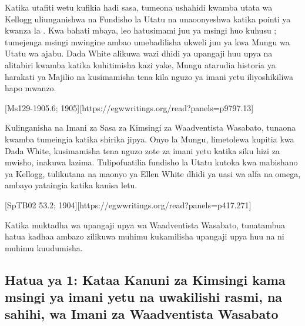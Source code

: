 

Katika utafiti wetu kufikia hadi sasa, tumeona ushahidi kwamba utata wa Kellogg uliunganishwa na Fundisho la Utatu na  unaoonyeshwa katika pointi ya kwanza la . Kwa bahati mbaya, leo hatusimami juu ya msingi huo kuhusu ; tumejenga msingi mwingine ambao umebadilisha ukweli juu ya  kwa Mungu wa Utatu wa ajabu. Dada White alikuwa wazi dhidi ya upangaji huu upya na alitabiri kwamba katika kuhitimisha kazi yake, Mungu atarudia historia ya harakati ya Majilio na kusimamisha tena kila nguzo ya imani yetu iliyoshikiliwa hapo mwanzo.

[Ms129-1905.6; 1905][https://egwwritings.org/read?panels=p9797.13]

Kulinganisha  na Imani za Sasa za Kimsingi za Waadventista Wasabato, tunaona kwamba tumeingia katika shirika jipya. Onyo la Mungu, limetolewa kupitia kwa Dada White, kusimamisha tena nguzo zote za imani yetu katika siku hizi za mwisho, inakuwa lazima. Tulipofuatilia fundisho la Utatu kutoka kwa mabishano ya Kellogg, tulikutana na maonyo ya Ellen White dhidi ya uasi wa alfa na omega, ambayo yataingia katika kanisa letu.

[SpTB02 53.2; 1904][https://egwwritings.org/read?panels=p417.271]

Katika muktadha wa upangaji upya wa Waadventista Wasabato, tunatambua hatua kadhaa ambazo zilikuwa muhimu kukamilisha upangaji upya huu na ni muhimu kuudumisha.

\subsection*{Hatua ya 1: Kataa Kanuni za Kimsingi kama msingi ya imani yetu na uwakilishi rasmi, na sahihi, wa Imani za Waadventista Wasabato}


